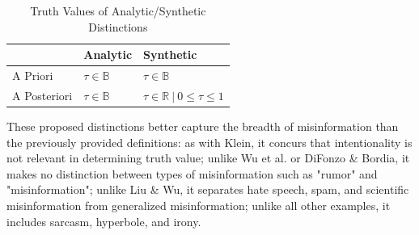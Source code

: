 \documentclass[preprint,review,12pt]{elsarticle}
\begin{document}
\begin{table}[h!]
\centering
\begin{tabular}{ |p{3cm}|p{5cm}|p{5cm}|}
 \hline
  & Analytic & Synthetic\\
 \hline
 A Priori & $\tau \in \mathbb{B}$ & $\tau \in \mathbb{B}$\\
 \hline
 A Posteriori &  $\tau \in \mathbb{B}$  & $\tau \in \mathbb{R} \ | \ 0 \leq \tau \leq 1$ \\
 \hline
\end{tabular}
\caption{Truth Values of Analytic/Synthetic Distinctions}
\label{tab:truthvalues}
\end{table}

These proposed distinctions better capture the breadth of misinformation than the previously provided definitions: as with Klein, it concurs that intentionality is not relevant in determining truth value; unlike Wu et al. or DiFonzo \& Bordia, it makes no distinction between types of misinformation such as "rumor" and "misinformation"; unlike Liu \& Wu, it separates hate speech, spam, and scientific misinformation from generalized misinformation; unlike all other examples, it includes sarcasm, hyperbole, and irony. 

\newpage
 

\end{document}
